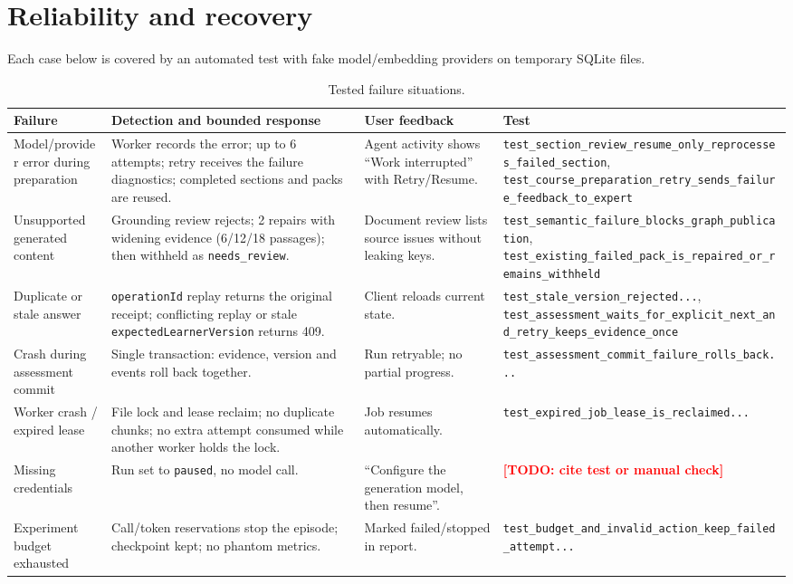 \documentclass{article}
\newcommand{\todo}[1]{\textcolor{red}{\textbf{[TODO: #1]}}}
\newcommand{\code}[1]{\texttt{\small #1}}
\begin{document}
\section{Reliability and recovery}
\label{sec:rel}

Each case below is covered by an automated test with fake model/embedding providers on temporary SQLite files.

\begin{table}[H]
\centering
\small
\caption{Tested failure situations.}
\begin{tabularx}{\linewidth}{@{}p{2.4cm}XXp{2.6cm}@{}}
\toprule
\textbf{Failure} & \textbf{Detection and bounded response} & \textbf{User feedback} & \textbf{Test} \\
\midrule
Model/provider error during preparation & Worker records the error; up to 6 attempts; retry receives the failure diagnostics; completed sections and packs are reused. & Agent activity shows ``Work interrupted'' with Retry/Resume. & \code{test\_section\_review\_resume\_only\_reprocesses\_failed\_section}, \code{test\_course\_preparation\_retry\_sends\_failure\_feedback\_to\_expert} \\
Unsupported generated content & Grounding review rejects; 2 repairs with widening evidence (6/12/18 passages); then withheld as \code{needs\_review}. & Document review lists source issues without leaking keys. & \code{test\_semantic\_failure\_blocks\_graph\_publication}, \code{test\_existing\_failed\_pack\_is\_repaired\_or\_remains\_withheld} \\
Duplicate or stale answer & \code{operationId} replay returns the original receipt; conflicting replay or stale \code{expectedLearnerVersion} returns 409. & Client reloads current state. & \code{test\_stale\_version\_rejected...}, \code{test\_assessment\_waits\_for\_explicit\_next\_and\_retry\_keeps\_evidence\_once} \\
Crash during assessment commit & Single transaction: evidence, version and events roll back together. & Run retryable; no partial progress. & \code{test\_assessment\_commit\_failure\_rolls\_back...} \\
Worker crash / expired lease & File lock and lease reclaim; no duplicate chunks; no extra attempt consumed while another worker holds the lock. & Job resumes automatically. & \code{test\_expired\_job\_lease\_is\_reclaimed...} \\
Missing credentials & Run set to \code{paused}, no model call. & ``Configure the generation model, then resume''. & \todo{cite test or manual check} \\
Experiment budget exhausted & Call/token reservations stop the episode; checkpoint kept; no phantom metrics. & Marked failed/stopped in report. & \code{test\_budget\_and\_invalid\_action\_keep\_failed\_attempt...} \\
\bottomrule
\end{tabularx}
\end{table}
\end{document}
